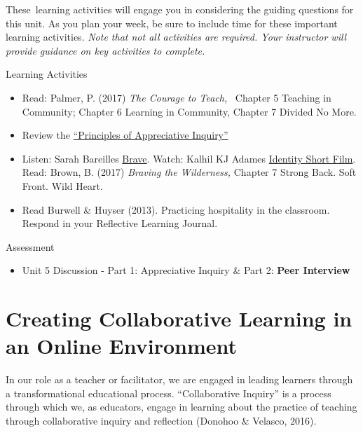 \documentclass[
]{book}
\providecommand{\tightlist}{%
  \setlength{\itemsep}{0pt}\setlength{\parskip}{0pt}}
\begin{document}
These~learning activities will engage you in considering the guiding questions for this unit. As you plan your week, be sure to include time for these important learning activities. \emph{Note that not all activities are required. Your instructor will provide guidance on key activities to complete.}

\begin{reflect}
{Learning Activities}

\begin{itemize}
\tightlist
\item
  Read: Palmer, P. (2017) \emph{The Courage to Teach,} ~Chapter 5 Teaching in Community; Chapter 6 Learning in Community, Chapter 7 Divided No More.\\
\item
  Review the \href{https://appreciativeinquiry.champlain.edu/learn/appreciative-inquiry-introduction/5-classic-principles-ai}{``Principles of Appreciative Inquiry''}\\
\item
  Listen: Sarah Bareilles \href{https://www.youtube.com/watch?v=QUQsqBqxoR4}{Brave}. Watch: Kalhil KJ Adames \href{https://www.youtube.com/watch?v=ikGVWEvUzNM}{Identity Short Film}. Read: Brown, B. (2017) \emph{Braving the Wilderness,} Chapter 7 Strong Back. Soft Front. Wild Heart.\\
\item
  Read Burwell \& Huyser (2013). Practicing hospitality in the classroom. Respond in your Reflective Learning Journal.
\end{itemize}
\end{reflect}

\begin{assessment}
{Assessment}

\begin{itemize}
\tightlist
\item
  Unit 5 Discussion - Part 1: Appreciative Inquiry \& Part 2: \textbf{Peer Interview}
\end{itemize}
\end{assessment}

\hypertarget{creating-collaborative-learning-in-an-online-environment}{%
\section{Creating Collaborative Learning in an Online Environment}\label{creating-collaborative-learning-in-an-online-environment}}

In our role as a teacher or facilitator, we are engaged in leading learners through a transformational educational process. ``Collaborative Inquiry'' is a process through which we, as educators, engage in learning about the practice of teaching through collaborative inquiry and reflection (Donohoo \& Velasco, 2016).
\end{document}
